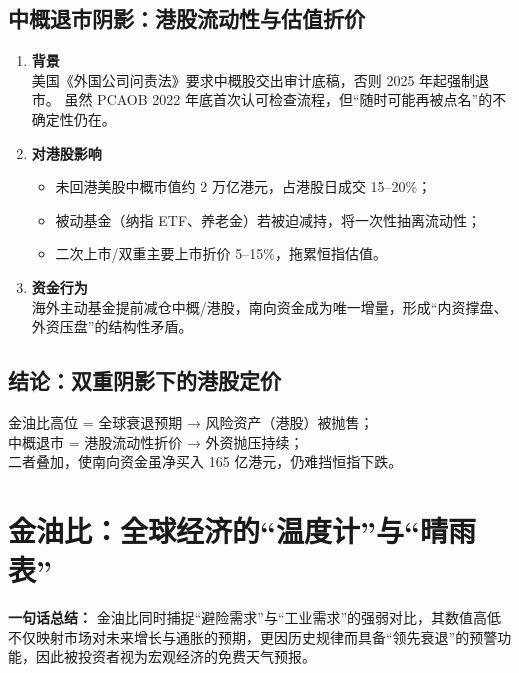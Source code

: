 \subsection{中概退市阴影：港股流动性与估值折价}
\begin{enumerate}[leftmargin=*, nosep]
    \item \textbf{背景}  \\
    美国《外国公司问责法》要求中概股交出审计底稿，否则 2025 年起强制退市。  
    虽然 PCAOB 2022 年底首次认可检查流程，但“随时可能再被点名”的不确定性仍在。
    \item \textbf{对港股影响}  
    \begin{itemize}[nosep]
        \item 未回港美股中概市值约 2 万亿港元，占港股日成交 15–20\%；  
        \item 被动基金（纳指 ETF、养老金）若被迫减持，将一次性抽离流动性；  
        \item 二次上市/双重主要上市折价 5–15\%，拖累恒指估值。
    \end{itemize}
    \item \textbf{资金行为}  \\
    海外主动基金提前减仓中概/港股，南向资金成为唯一增量，形成{\color{red}“内资撑盘、外资压盘”}的结构性矛盾。
\end{enumerate}

\subsection{结论：双重阴影下的港股定价}
金油比高位 = 全球衰退预期 → 风险资产（港股）被抛售；  \\
中概退市 = 港股流动性折价 → 外资抛压持续；  \\
二者叠加，使南向资金虽净买入 165 亿港元，仍难挡恒指下跌。

\section{金油比：全球经济的“温度计”与“晴雨表”}
\textbf{一句话总结：}  
金油比同时捕捉“避险需求”与“工业需求”的强弱对比，其数值高低不仅映射市场对未来增长与通胀的预期，更因历史规律而具备“领先衰退”的预警功能，因此被投资者视为宏观经济的免费天气预报。

